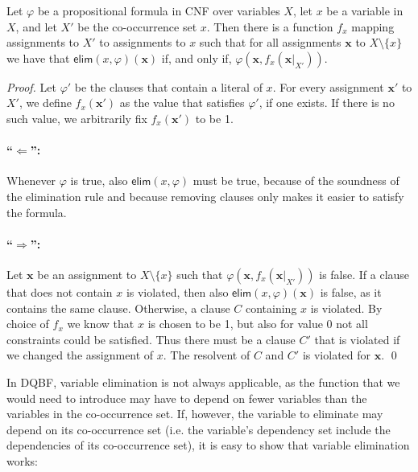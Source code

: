 \documentclass{svjour3}
\newcommand{\ass}[1]{\mathbf{#1}}
\begin{document}
\begin{lemma}\label{lem:variableeliminationwithdependencies}
	Let $\varphi$ be a propositional formula in CNF over variables $X$, let $x$ be a variable in $X$, and let $X'$ be the co-occurrence set $x$.
	Then there is a function $f_x$ mapping assignments to $X'$ to assignments to $x$ such that for all assignments $\ass x$ to $X\setminus\{x\}$ we have that $\mathsf{elim}(x,\varphi)(\ass x)$ if, and only if, $\varphi(\ass x, f_x(\ass x|_{X'}))$.
\end{lemma}

\begin{proof}
	Let $\varphi'$ be the clauses that contain a literal of $x$. 
	For every assignment $\ass x'$ to $X'$, we define $f_x(\ass x')$ as the value that satisfies $\varphi'$, if one exists. 
	If there is no such value, we arbitrarily fix $f_x(\ass x')$ to be 1. 
	
	\paragraph{\quad``$\Longleftarrow\!$'':~}
	Whenever $\varphi$ is true, also $\mathsf{elim}(x,\varphi)$ must be true, because of the soundness of the elimination rule and because removing clauses only makes it easier to satisfy the formula. 

	\paragraph{\quad``$\Longrightarrow \!$'':~}
	Let $\ass x$ be an assignment to $X\setminus\{x\}$ 
	such that $\varphi(\ass x, f_x(\ass x|_{X'}))$ is false. 
	If a clause that does not contain $x$ is violated, then also $\mathsf{elim}(x,\varphi)(\ass x)$ is false, as it contains the same clause. 
	Otherwise, a clause $C$ containing $x$ is violated. 
	By choice of $f_x$ we know that $x$ is chosen to be 1, but also for value 0 not all constraints could be satisfied. 
	Thus there must be a clause $C'$ that is violated if we changed the assignment of $x$.
	The resolvent of $C$ and $C'$ is violated for $\ass x$. 
	\qed
\end{proof}

In DQBF, variable elimination is not always applicable, as the function that we would need to introduce may have to depend on fewer variables than the variables in the co-occurrence set.
If, however, the variable to eliminate may depend on its co-occurrence set (i.e. the variable's dependency set include the dependencies of its co-occurrence set), it is easy to show that variable elimination works:
\end{document}
